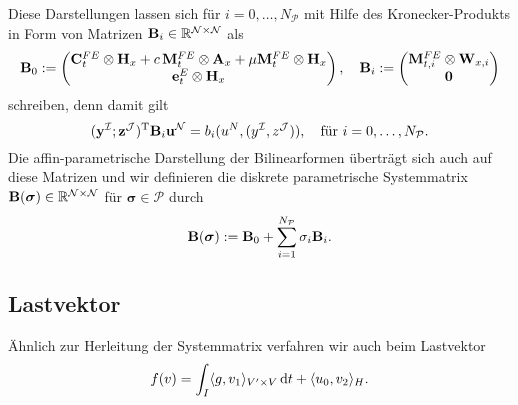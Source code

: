 \documentclass[../main.tex]{subfiles}
\begin{document}
Diese Darstellungen lassen sich für $i = 0, \dots, N_{\mathcal P}$ mit Hilfe des Kronecker-Produkts in Form von Matrizen $\mathbf{B}_{i} \in \mathbb{R}^{\mathcal N \times \mathcal N}$ als
\begin{equation}
    \mathbf{B}_{0} := \begin{pmatrix}
    \mathbf{C}_{t}^{FE} \otimes \mathbf{H}_{x} + c\,\mathbf{M}_{t}^{FE} \otimes \mathbf{A}_{x} + \mu \mathbf{M}_{t}^{FE} \otimes \mathbf{H}_{x} \\
    \mathbf{e}_{t}^{E} \otimes \mathbf{H}_{x}
    \end{pmatrix}, \quad
    \mathbf{B}_{i} :=  \begin{pmatrix}
    \mathbf{M}_{t,i}^{FE} \otimes \mathbf{W}_{x,i} \\
    \mathbf{0}
    \end{pmatrix}
\end{equation}
schreiben, denn damit gilt
\begin{equation}
    (\mathbf{y}^{\mathcal I}; \mathbf{z}^{\mathcal J})^{\mathrm{T}} \mathbf{B}_{i} \mathbf{u}^{\mathcal N} = b_{i}(u^{N}, (y^{\mathcal I}, z^{\mathcal J})), \quad \text{für } i = 0, \dots, N_{\mathcal P}.
\end{equation}
Die affin-parametrische Darstellung der Bilinearformen überträgt sich auch auf diese Matrizen und wir definieren die diskrete parametrische Systemmatrix $\mathbf{B}(\bm \sigma) \in \mathbb{R}^{\mathcal N \times \mathcal N}$ für $\bm \sigma \in \mathcal P$ durch
\begin{equation}
    \mathbf{B}(\bm \sigma) := \mathbf{B}_{0} + \sum_{i = 1}^{N_{\mathcal P}} \sigma_{i} \mathbf{B}_{i}.
\end{equation}


\subsection*{Lastvektor} %

Ähnlich zur Herleitung der Systemmatrix verfahren wir auch beim Lastvektor
\begin{equation}
    f(v) = \int_{I} \langle g,v_{1}\rangle_{V' \times V} \mathop{}\!\mathrm{d} t + \langle u_{0},v_{2}\rangle_{H}.
\end{equation}
\end{document}
